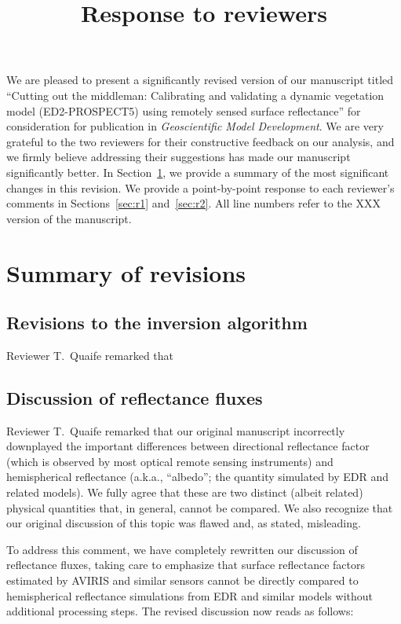 \documentclass{article}
\title{Response to reviewers}
\author{}
\begin{document}
\maketitle

We are pleased to present a significantly revised version of our manuscript titled
``Cutting out the middleman: Calibrating and validating a dynamic vegetation model (ED2-PROSPECT5) using remotely sensed surface reflectance''
for consideration for publication in \emph{Geoscientific Model Development}.
We are very grateful to the two reviewers for their constructive feedback on our analysis, and we firmly believe addressing their suggestions has made our manuscript significantly better.
In Section~\ref{sec:summary}, we provide a summary of the most significant changes in this revision.
We provide a point-by-point response to each reviewer's comments in Sections~\ref{sec:r1} and~\ref{sec:r2}.
All line numbers refer to the XXX version of the manuscript.

\section{Summary of revisions}\label{sec:summary}

\subsection{Revisions to the inversion algorithm}\label{subsec:algorithm}

Reviewer T.\ Quaife remarked that

\subsection{Discussion of reflectance fluxes}\label{subsec:brdf}

Reviewer T.\ Quaife remarked that our original manuscript incorrectly downplayed the important differences between directional reflectance factor (which is observed by most optical remote sensing instruments) and hemispherical reflectance (a.k.a., ``albedo''; the quantity simulated by EDR and related models).
We fully agree that these are two distinct (albeit related) physical quantities that, in general, cannot be compared.
We also recognize that our original discussion of this topic was flawed and, as stated, misleading.

To address this comment, we have completely rewritten our discussion of reflectance fluxes, taking care to emphasize that surface reflectance factors estimated by AVIRIS and similar sensors cannot be directly compared to hemispherical reflectance simulations from EDR and similar models without additional processing steps. The revised discussion now reads as follows:
\end{document}
